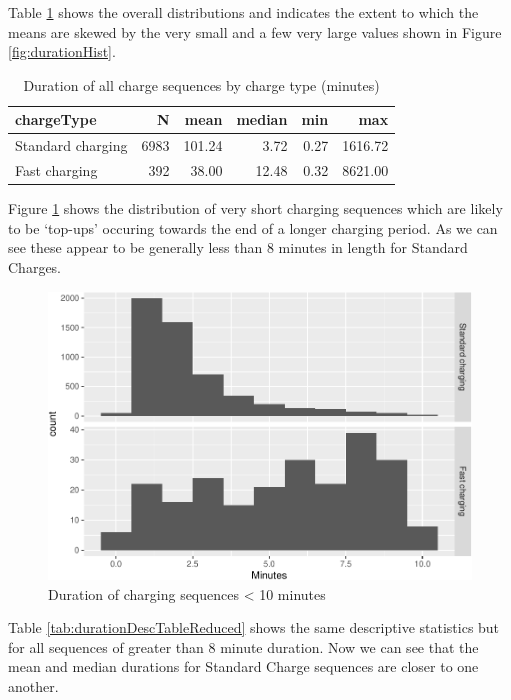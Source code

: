 \documentclass[]{article}
\begin{document}
Table \ref{tab:durationDescTable} shows the overall distributions and
indicates the extent to which the means are skewed by the very small and
a few very large values shown in Figure \ref{fig:durationHist}.

\begin{table}[t]

\caption{\label{tab:durationDescTable}Duration of all charge sequences by charge type (minutes)}
\centering
\begin{tabular}{l|r|r|r|r|r}
\hline
chargeType & N & mean & median & min & max\\
\hline
Standard charging & 6983 & 101.24 & 3.72 & 0.27 & 1616.72\\
\hline
Fast charging & 392 & 38.00 & 12.48 & 0.32 & 8621.00\\
\hline
\end{tabular}
\end{table}

Figure \ref{fig:shortDuration} shows the distribution of very short
charging sequences which are likely to be `top-ups' occuring towards the
end of a longer charging period. As we can see these appear to be
generally less than 8 minutes in length for Standard Charges.

\begin{figure}
\centering
\includegraphics{EVBB_report_files/figure-latex/shortDuration-1.pdf}
\caption{\label{fig:shortDuration}Duration of charging sequences \textless{}
10 minutes}
\end{figure}

Table \ref{tab:durationDescTableReduced} shows the same descriptive
statistics but for all sequences of greater than 8 minute duration. Now
we can see that the mean and median durations for Standard Charge
sequences are closer to one another.
\end{document}
